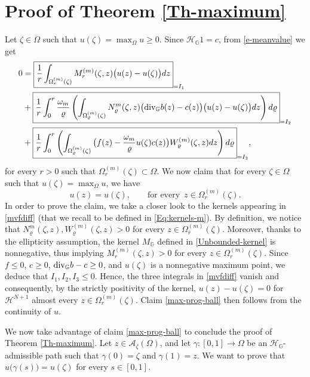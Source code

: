\documentclass[11pt,a4paper]{article}
\numberwithin{equation}{section}
\def \r {\varrho}
\def \A {\mathscr{A}}
\def \GG {{\mathbb{G}}}
\def \div {{\text{\rm div}}}
\def \H {\mathscr{H}_\GG}
\def \z {{\zeta}}
\def \O {{\Omega}}
\begin{document}
{{\section{Proof of Theorem \ref{Th-maximum}}\label{Maximum}
Let $\z\in\O$ such that $u(\z)=\max_\O u\geq 0$. Since $\H1=c$, from \eqref{e-meanvalue} we get
\begin{equation}
	\begin{aligned}\label{mvfdiff}
		0&=\boxed{\frac{1}{r}\int_{\O^{(m)}_r(\z)}M_r^{(m)}(\z,z)\big(u(z)-u(\z)\big)dz}_{=I_1}\\
		& +\boxed{\frac{1}{r}\int_{0}^r\frac{\omega_m}{\r}\left(\int_{\O^{(m)}_\r(\z)}N_\r^m(\z,z)\big(\div_{\GG} b(z)-c(z)\big)\big(u(z)-u(\z)\big)dz\right)d\r}_{=I_2}\\
		& +\boxed{\frac{1}{r}\int_{0}^r\left(\int_{\O^{(m)}_\r(\z)}\big(f(z)-\frac{\omega_m}{\r}u(\z)c(z)\big) W_\r^{(m)}(\z,z) dz\right)d\r}_{=I_3},\\
	\end{aligned}
\end{equation}
for every $r >0$ such that $\Omega^{(m)}_r(\z) \subset \Omega$. We now claim that for every $\zeta \in \Omega$ such that $u(\zeta)=\max_{\Omega}u$, we have
\begin{equation}\label{max-prog-ball}
	u(z)=u(\z),\qquad \text{for every }\,z\in \O^{(m)}_r(\z).
\end{equation}
In order to prove the claim, we take a closer look to the kernels appearing in \eqref{mvfdiff} (that we recall to be defined in \eqref{Eq:kernels-m}). By definition, we notice that $N_\r^m(\z,z),W_\r^{(m)}(\z,z)>0$ for every $z\in \O^{(m)}_r(\z)$. Moreover, thanks to the ellipticity assumption, the kernel $M_\GG$ defined in \eqref{Unbounded-kernel} is nonnegative, thus implying $M_r^{(m)}(\z,z) >0$ for every $z\in \O^{(m)}_r(\z)$. Since $f\leq 0$, $c\geq 0$, $\div_\GG b-c\geq 0$, and $u(\z)$ is a nonnegative maximum point, we deduce that $I_1,I_2,I_3\leq 0$. Hence, the three integrals in \eqref{mvfdiff} vanish and consequently, by the strictly positivity of the kernel, $u(z)-u(\z)=0$ for $\mathcal{H}^{N+1}$ almost every $z \in \O^{(m)}_r(\z)$. Claim \eqref{max-prog-ball} then follows from the continuity of $u$.


We now take advantage of claim \eqref{max-prog-ball} to conclude the proof of Theorem \ref{Th-maximum}. Let $z\in\A_\z(\O)$, and let $\gamma:[0,1]\to \O$ be an $\H$-admissible path such that $\gamma(0)=\z$ and $\gamma(1)=z$. We want to prove that $u\big(\gamma(s)\big)=u(\z)$ for every $s\in [0,1]$. 


}}
\end{document}
